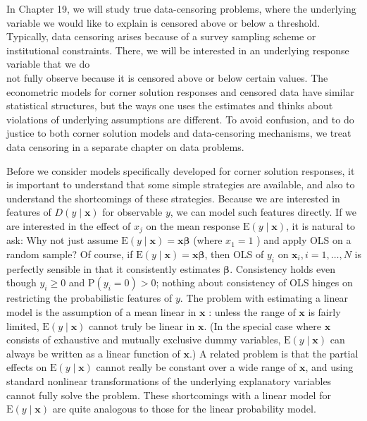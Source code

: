 \documentclass[10pt]{article}
\begin{document}
In Chapter 19, we will study true data-censoring problems, where the underlying variable we would like to explain is censored above or below a threshold. Typically, data censoring arises because of a survey sampling scheme or institutional constraints. There, we will be interested in an underlying response variable that we do\\
not fully observe because it is censored above or below certain values. The econometric models for corner solution responses and censored data have similar statistical structures, but the ways one uses the estimates and thinks about violations of underlying assumptions are different. To avoid confusion, and to do justice to both corner solution models and data-censoring mechanisms, we treat data censoring in a separate chapter on data problems.

Before we consider models specifically developed for corner solution responses, it is important to understand that some simple strategies are available, and also to understand the shortcomings of these strategies. Because we are interested in features of $D(y \mid \mathbf{x})$ for observable $y$, we can model such features directly. If we are interested in the effect of $x_{j}$ on the mean response $\mathrm{E}(y \mid \mathbf{x})$, it is natural to ask: Why not just assume $\mathrm{E}(y \mid \mathbf{x})=\mathbf{x} \boldsymbol{\beta}$ (where $x_{1}=1$ ) and apply OLS on a random sample? Of course, if $\mathrm{E}(y \mid \mathbf{x})=\mathbf{x} \boldsymbol{\beta}$, then OLS of $y_{i}$ on $\mathbf{x}_{i}, i=1, \ldots, N$ is perfectly sensible in that it consistently estimates $\boldsymbol{\beta}$. Consistency holds even though $y_{i} \geq 0$ and $\mathrm{P}\left(y_{i}=0\right)>0$; nothing about consistency of OLS hinges on restricting the probabilistic features of $y$. The problem with estimating a linear model is the assumption of a mean linear in $\mathbf{x}$ : unless the range of $\mathbf{x}$ is fairly limited, $\mathrm{E}(y \mid \mathbf{x})$ cannot truly be linear in $\mathbf{x}$. (In the special case where $\mathbf{x}$ consists of exhaustive and mutually exclusive dummy variables, $\mathrm{E}(y \mid \mathbf{x})$ can always be written as a linear function of $\mathbf{x}$.) A related problem is that the partial effects on $\mathrm{E}(y \mid \mathbf{x})$ cannot really be constant over a wide range of $\mathbf{x}$, and using standard nonlinear transformations of the underlying explanatory variables cannot fully solve the problem. These shortcomings with a linear model for $\mathrm{E}(y \mid \mathbf{x})$ are quite analogous to those for the linear probability model.
\end{document}
